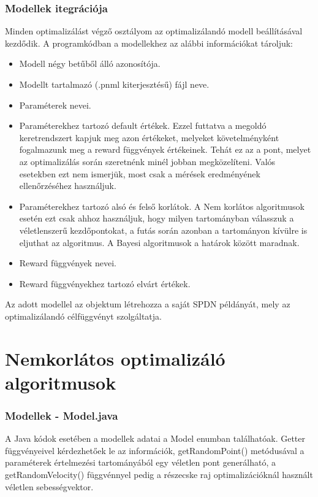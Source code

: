 \subsubsection{Modellek itegrációja}
Minden optimalizálást végző osztályom az optimalizálandó modell beállításával kezdődik. A programkódban a modellekhez az alábbi információkat tároljuk:
\begin{itemize}
	\item Modell négy betűből álló azonosítója.
	\item Modellt tartalmazó (.pnml kiterjesztésű) fájl neve.
	\item Paraméterek nevei.
	\item Paraméterekhez tartozó default értékek. Ezzel futtatva a megoldó keretrendszert kapjuk meg azon értékeket, melyeket követelményként fogalmazunk meg a reward függvények értékeinek. Tehát ez az a pont, melyet az optimalizálás során szeretnénk minél jobban megközelíteni. Valós esetekben ezt nem ismerjük, most csak a mérések eredményének ellenőrzéséhez használjuk.
	\item Paraméterekhez tartozó alsó és felső korlátok. A Nem korlátos algoritmusok esetén ezt csak ahhoz használjuk, hogy milyen tartományban válasszuk a véletlenszerű kezdőpontokat, a futás során azonban a tartományon kívülre is eljuthat az algoritmus. A Bayesi algoritmusok a határok között maradnak.
	\item Reward függvények nevei.
	\item Reward függvényekhez tartozó elvárt értékek.
\end{itemize}

Az adott modellel az objektum létrehozza a saját SPDN példányát, mely az optimalizálandó célfüggvényt szolgáltatja.

\section{Nemkorlátos optimalizáló algoritmusok}

\subsubsection{Modellek - Model.java}
A Java kódok esetében a modellek adatai a Model enumban találhatóak. Getter függvényeivel kérdezhetőek le az információk, getRandomPoint() metódusával a paraméterek értelmezési tartományából egy véletlen pont generálható, a getRandomVelocity() függvénnyel pedig a részecske raj optimalizációknál használt véletlen sebességvektor.

